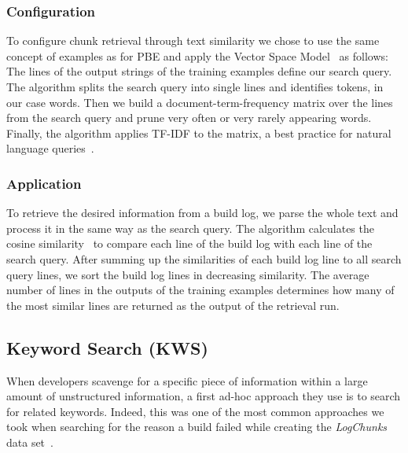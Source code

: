 \subsubsection{Configuration}
To configure chunk retrieval through text similarity we chose to use
the same concept of examples as for PBE
and apply the Vector Space Model~\cite{schutze2008introduction}
as follows:
The lines of the output strings of the training examples define our
search query.
The algorithm splits the search query into single lines and
identifies tokens, in our case words.
Then we build a
document-term-frequency matrix over the lines from the search query
and prune very often or very rarely appearing words.
Finally, the
algorithm applies TF-IDF to the matrix, a best practice for natural
language queries~\cite{lee1997document}.

\subsubsection{Application}
To retrieve the desired information from a build log, we parse the
whole text and process it in the same way as the search query.
The algorithm calculates the cosine
similarity~\cite{korenius2007principal} to compare each line of the
build log with each line of the search query.
After summing up the
similarities of each build log line to all search query lines, we sort
the build log lines in decreasing similarity.
The average number of
lines in the outputs of the training examples determines how many of
the most similar lines are returned as the output of the retrieval
run.

\subsection{Keyword Search (KWS)}
When developers scavenge for a specific piece of information within a
large amount of unstructured information, a first ad-hoc approach they
use is to search for related keywords.
Indeed, this was one of the
most common approaches we took when searching for the reason a build
failed while creating the \emph{LogChunks} data
set~\cite{brandt2020logchunks}.

